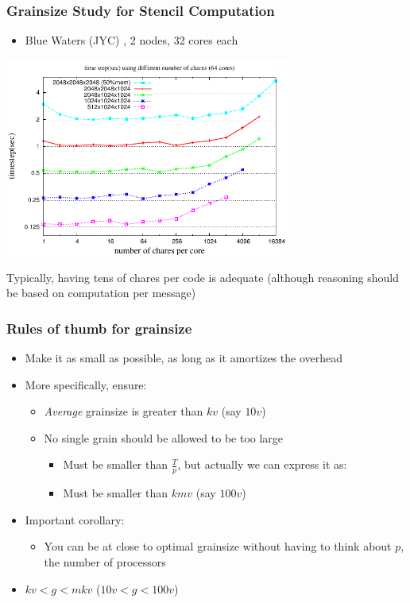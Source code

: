 \begin{frame}
  \frametitle{Grainsize Study for Stencil Computation}
  \begin{itemize}
    \item Blue Waters (JYC) , 2 nodes, 32 cores each
  \end{itemize}
  \begin{center} \includegraphics[width=0.7\textwidth]{figures/jacobi-grainsize.pdf} \end{center}

Typically, having tens of chares per code is adequate (although
reasoning should be based on computation per message)

\end{frame}

\begin{frame}
  \frametitle{Rules of thumb for grainsize}
  \begin{itemize}
    \item Make it as small as possible, as long as it amortizes the overhead
    \item More specifically, ensure:
      \begin{itemize}
      \item \textit{Average} grainsize is greater than $kv$ (say $10v$)
      \item No single grain should be allowed to be too large 
        \begin{itemize}
          \item Must be smaller than $\frac{T}{p}$, but actually we can express
            it as:
          \item Must be smaller than $kmv$ (say $100v$)
        \end{itemize}
      \end{itemize}
    \item Important corollary:
      \begin{itemize}
      \item You can be at close to optimal grainsize without having to think
        about $p$, the number of processors
      \end{itemize}
    \item $kv < g < mkv$ ($10v < g < 100v$)
  \end{itemize}
\end{frame}

